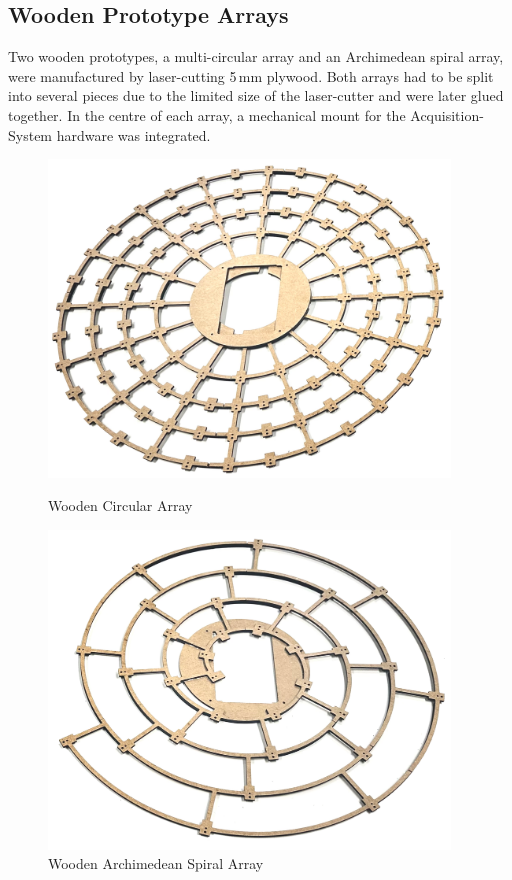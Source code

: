 \subsection{Wooden Prototype Arrays}
Two wooden prototypes, a multi-circular array and an Archimedean spiral array, were manufactured by laser-cutting 5\,mm plywood.
Both arrays had to be split into several pieces due to the limited size of the laser-cutter and were later glued together.
In the centre of each array, a mechanical mount for the Acquisition-System hardware was integrated.
\begin{figure}[h!]
	\centering
	\begin{minipage}{0.49\textwidth}
		\centering
		\includegraphics[width=0.95\textwidth]{images/5_array_evaluation/wooden_circular_array.png}
		\caption{Wooden Circular Array}
		\label{fig:wooden_circular_array}
	\end{minipage}
	\begin{minipage}{0.49\textwidth}
		\centering
		\includegraphics[width=0.95\textwidth]{images/5_array_evaluation/wooden_archimedean_spiral_array.png}
		\caption{Wooden Archimedean Spiral Array}
		\label{fig:wooden_archimedean_spiral_array}
	\end{minipage}
\end{figure}


